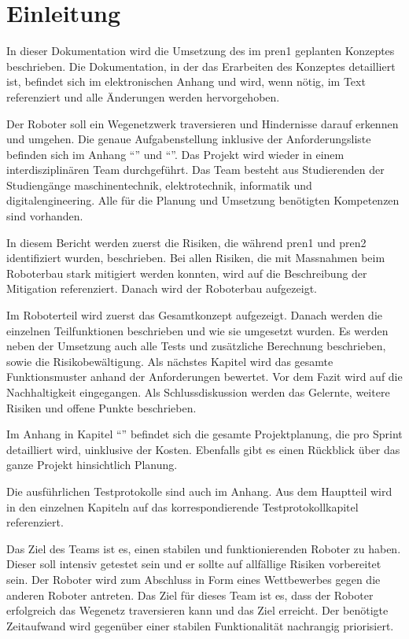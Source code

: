 \section{Einleitung}

In dieser Dokumentation wird die Umsetzung des im \acrfull{pren1} geplanten Konzeptes beschrieben. 
Die Dokumentation, in der das Erarbeiten des Konzeptes detailliert ist, befindet sich im elektronischen Anhang und wird, wenn nötig, im Text referenziert und alle Änderungen werden hervorgehoben.

Der Roboter soll ein Wegenetzwerk traversieren und Hindernisse darauf erkennen und umgehen. Die genaue Aufgabenstellung inklusive der Anforderungsliste befinden sich im Anhang ``'' und ``''. Das Projekt wird wieder in einem interdisziplinären Team durchgeführt. Das Team besteht aus Studierenden der Studiengänge \acrfull{maschinentechnik}, \acrfull{elektrotechnik}, \acrfull{informatik} und \acrfull{digitalengineering}. Alle für die Planung und Umsetzung benötigten Kompetenzen sind vorhanden.


In diesem Bericht werden zuerst die Risiken, die während \acrshort{pren1} und \acrshort{pren2} identifiziert wurden, beschrieben. Bei allen Risiken, die mit Massnahmen beim Roboterbau stark mitigiert werden konnten, wird auf die Beschreibung der Mitigation referenziert. Danach wird der Roboterbau aufgezeigt.

Im Roboterteil wird zuerst das Gesamtkonzept aufgezeigt. Danach werden die einzelnen Teilfunktionen beschrieben und wie sie umgesetzt wurden. Es werden neben der Umsetzung auch alle Tests und zusätzliche Berechnung beschrieben, sowie die Risikobewältigung. 
Als nächstes Kapitel wird das gesamte Funktionsmuster anhand der Anforderungen bewertet. Vor dem Fazit wird auf die Nachhaltigkeit eingegangen. Als Schlussdiskussion werden das Gelernte, weitere Risiken und offene Punkte beschrieben.

Im Anhang in Kapitel ``'' befindet sich die gesamte Projektplanung, die pro Sprint detailliert wird, uinklusive der Kosten. Ebenfalls gibt es einen Rückblick über das ganze Projekt hinsichtlich Planung.

Die ausführlichen Testprotokolle sind auch im Anhang. Aus dem Hauptteil wird in den einzelnen Kapiteln auf das korrespondierende Testprotokollkapitel referenziert.


Das Ziel des Teams ist es, einen stabilen und funktionierenden Roboter zu haben. Dieser soll intensiv getestet sein und er sollte auf allfällige Risiken vorbereitet sein. Der Roboter wird zum Abschluss in Form eines Wettbewerbes gegen die anderen Roboter antreten. Das Ziel für dieses Team ist es, dass der Roboter erfolgreich das Wegenetz traversieren kann und das Ziel erreicht. Der benötigte Zeitaufwand wird gegenüber einer stabilen Funktionalität nachrangig priorisiert.
